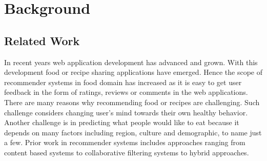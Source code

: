 \chapter{Background}
\label{ch:background}
\section{Related Work}

In recent years web application development has advanced and grown. With this development food or recipe sharing applications have emerged. Hence the scope of recommender systems in food domain has increased as it is easy to get user feedback in the form of ratings, reviews or comments in the web applications.
\\
\noindent There are many reasons why recommending food or recipes are challenging. Such challenge considers changing user's mind towards their own healthy behavior. Another challenge is in predicting what people would like to eat because it depends on many factors including region, culture and demographic, to name just a few. Prior work in recommender systems includes approaches ranging from content based systems to collaborative filtering systems to hybrid approaches. 
\\

